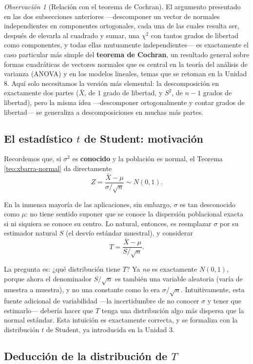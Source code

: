 \documentclass[11pt,a4paper]{article}
\theoremstyle{plain}
\theoremstyle{definition}
\theoremstyle{remark}
\newtheorem{observacion}[teorema]{Observación}
\begin{document}
\begin{observacion}[Relación con el teorema de Cochran]
El argumento presentado en las dos subsecciones anteriores —descomponer un vector de normales independientes en componentes ortogonales, cada una de las cuales resulta ser, después de elevarla al cuadrado y sumar, una $\chi^2$ con tantos grados de libertad como componentes, y todas ellas mutuamente independientes— es exactamente el caso particular más simple del \textbf{teorema de Cochran}, un resultado general sobre formas cuadráticas de vectores normales que es central en la teoría del análisis de varianza (ANOVA) y en los modelos lineales, temas que se retoman en la Unidad 8. Aquí solo necesitamos la versión más elemental: la descomposición en exactamente dos partes ($\bar X$, de $1$ grado de libertad, y $S^2$, de $n-1$ grados de libertad), pero la misma idea —descomponer ortogonalmente y contar grados de libertad— se generaliza a descomposiciones en muchas más partes.
\end{observacion}

\subsection{El estadístico $t$ de Student: motivación}

Recordemos que, si $\sigma^2$ es \textbf{conocido} y la población es normal, el Teorema \ref{teo:xbarra-normal} da directamente
$$Z = \frac{\bar X-\mu}{\sigma/\sqrt n} \sim N(0,1).$$

En la inmensa mayoría de las aplicaciones, sin embargo, $\sigma$ es tan desconocido como $\mu$: no tiene sentido suponer que se conoce la dispersión poblacional exacta si ni siquiera se conoce su centro. Lo natural, entonces, es reemplazar $\sigma$ por su estimador natural $S$ (el desvío estándar muestral), y considerar
$$T = \frac{\bar X-\mu}{S/\sqrt n}.$$

La pregunta es: ¿qué distribución tiene $T$? Ya \emph{no} es exactamente $N(0,1)$, porque ahora el denominador $S/\sqrt n$ es también una variable aleatoria (varía de muestra a muestra), y no una constante como lo era $\sigma/\sqrt n$. Intuitivamente, esta fuente adicional de variabilidad —la incertidumbre de no conocer $\sigma$ y tener que estimarlo— debería hacer que $T$ tenga una distribución algo más dispersa que la normal estándar. Esta intuición es exactamente correcta, y se formaliza con la distribución $t$ de Student, ya introducida en la Unidad 3.

\subsection{Deducción de la distribución de $T$}
\end{document}
